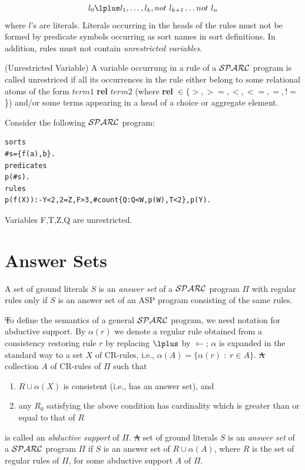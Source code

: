 \documentclass[12pt, letterpaper]{article}
\begin{document}
\begin{equation}
   [label:] l_0 \lplus l_1,  \ldots, l_k, not~l_{k+1} \ldots not~l_{n}
 \end{equation}
where $l$'s are literals.
Literals occurring in the heads of the rules must not be formed by predicate symbols
occurring as sort names in sort definitions. In addition, rules must not contain \textit{unrestricted variables}.

\begin{definition}(Unrestricted Variable)
 A variable occurrung in a rule of a ${\cal SPARC}$ program is called unrestriced if all its occurrences in the rule either belong to some relational atoms of the form 
$term1$ \textbf{rel} $term2$ (where \textbf{rel} $\in  \{>,>=,<,<=,=,!=$\})  and/or  some terms appearing in a head of a choice or aggregate element. 
\end{definition}
\begin{example}
\em{
 Consider the following ${\cal SPARC}$ program:
\begin{verbatim}
sorts
#s={f(a),b}.
predicates
p(#s).
rules
p(f(X)):-Y<2,2=Z,F>3,#count{Q:Q<W,p(W),T<2},p(Y).
\end{verbatim}
Variables F,T,Z,Q are unrestricted.
}  
\end{example}

 
\section{Answer Sets}
\noindent A set of ground literals $S$ is an {\em answer set} of a ${\cal SPARC}$ 
program $\Pi$ with regular rules only if $S$ is an answer set of an ASP program consisting of the same rules.

\st To define the semantics of a general ${\cal SPARC}$ program, we need notation for abductive support.
By $\alpha(r)$ we denote a regular rule
obtained from a consistency restoring rule $r$
by replacing $\lplus$ by $\leftarrow$;
$\alpha$ is expanded in the standard way to a set $X$ of CR-rules,
i.e., $\alpha(A) = \{\alpha(r)\; :\; r \in A\}$.
\st A %
collection $A$ of CR-rules of $\Pi$ such that
\begin{enumerate}
\item $R \cup \alpha(X)$ is consistent (i.e., has an answer set), and
\item any $R_0$ satisfying the above condition has cardinality
which is greater than or equal to that of $R$
\end{enumerate}
is called an {\em abductive support} of $\Pi$.
\st A set of ground literals $S$ is an {\em answer set} of a ${\cal SPARC}$ program 
$\Pi$ if $S$ is an answer set of $R \cup \alpha(A)$, where $R$ is the set of regular rules of $\Pi$, for some abductive
support $A$ of $\Pi$.
\end{document}
